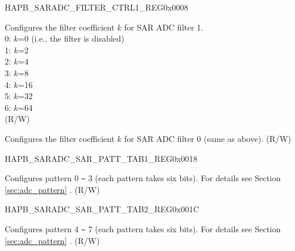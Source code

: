 \begin{register}{H}{APB\_SARADC\_FILTER\_CTRL1\_REG}{0x0008}\label{regdesc:APBSARADCFILTERCTRL1REG}
%
%
%
\regnewline%
\begin{regdesc}\begin{reglist}
\label{fielddesc:APBSARADCFILTERFACTOR1}\item [APB\_SARADC\_FILTER\_FACTOR1] Configures the filter coefficient \(k\) for SAR ADC filter 1.\\
0: \(k\)=0 (i.e., the filter is disabled)\\
1: \(k\)=2\\
2: \(k\)=4\\
3: \(k\)=8\\
4: \(k\)=16\\
5: \(k\)=32\\
6: \(k\)=64\\
(R/W)
\label{fielddesc:APBSARADCFILTERFACTOR0}\item [APB\_SARADC\_FILTER\_FACTOR0] Configures the filter coefficient \(k\) for SAR ADC filter 0 (same as above). (R/W)
\end{reglist}\end{regdesc}
\end{register}


\begin{register}{H}{APB\_SARADC\_SAR\_PATT\_TAB1\_REG}{0x0018}\label{regdesc:APBSARADCSARPATTTAB1REG}
%
%
\regnewline%
\begin{regdesc}\begin{reglist}
\label{fielddesc:APBSARADCSARPATTTAB1}\item [APB\_SARADC\_SAR\_PATT\_TAB1] Configures pattern 0 \verb+~+ 3 (each pattern takes six bits). For details see Section \ref{sec:adc_pattern} \textit{}. (R/W)
\end{reglist}\end{regdesc}
\end{register}


\begin{register}{H}{APB\_SARADC\_SAR\_PATT\_TAB2\_REG}{0x001C}\label{regdesc:APBSARADCSARPATTTAB2REG}
%
%
\regnewline%
\begin{regdesc}\begin{reglist}
\label{fielddesc:APBSARADCSARPATTTAB2}\item [APB\_SARADC\_SAR\_PATT\_TAB2] Configures pattern 4 \verb+~+ 7 (each pattern takes six bits). For details see Section \ref{sec:adc_pattern} \textit{}. (R/W)
\end{reglist}\end{regdesc}
\end{register}


